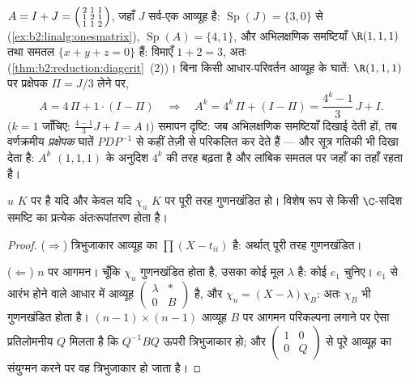 \begin{example}[विकर्णन काम पर]\label{ex:b2:reduction:diagwork}
$A = I + J = \begin{psmallmatrix}2 & 1 & 1\\ 1 & 2 & 1\\ 1 & 1 &
2\end{psmallmatrix}$, जहाँ $J$ सर्व-एक आव्यूह है:
$\operatorname{Sp}(J) = \{3, 0\}$
से (\cref{ex:b2:linalg:onesmatrix}), $\operatorname{Sp}(A) = \{4,
1\}$, और अभिलक्षणिक समष्टियाँ $\R(1,1,1)$ तथा समतल $\{x + y + z =
0\}$ हैं: विमाएँ
$1 + 2 = 3$, अतः  (\cref{thm:b2:reduction:diagcrit}~(2))। बिना किसी आधार-परिवर्तन आव्यूह के घातें:
$\R(1,1,1)$ पर प्रक्षेपक $\Pi = J/3$ लेने पर,
\[
A = 4\,\Pi + 1\cdot(I - \Pi)
\quad\Longrightarrow\quad
A^k = 4^k\,\Pi + (I - \Pi)
= \frac{4^k - 1}{3}\,J + I .
\]
($k = 1$ जाँचिए: $\frac{4-1}3 J + I = A$।) समापन दृष्टि: जब अभिलक्षणिक समष्टियाँ दिखाई देती
हों, तब वर्णक्रमीय \emph{प्रक्षेपक} घातें $PDP^{-1}$ से कहीं तेज़ी से परिकलित
कर देते हैं --- और सूत्र गतिकी भी दिखा देता है: $A^k$ $(1,1,1)$ के अनुदिश
$4^k$ की तरह बढ़ता है और लांबिक समतल पर जहाँ का तहाँ रहता है।
\end{example}

\begin{theorem}[त्रिभुजन]\label{thm:b2:reduction:trigonalization}
$u$ $K$ पर  है यदि और केवल यदि $\chi_u$ $K$ पर पूरी तरह गुणनखंडित
हो। विशेष रूप से किसी $\C$-सदिश समष्टि का प्रत्येक अंतःरूपांतरण
 होता है।
\end{theorem}

\begin{proof}
($\Rightarrow$) त्रिभुजाकार आव्यूह का  $\prod(X - t_{ii})$ है: अर्थात् पूरी तरह
गुणनखंडित।

($\Leftarrow$) $n$ पर आगमन। चूँकि $\chi_u$ गुणनखंडित होता है, उसका कोई मूल $\lambda$ है:
कोई  $e_1$ चुनिए। $e_1$ से आरंभ होने वाले आधार में आव्यूह
$\begin{pmatrix} \lambda & \ast\\ 0 &
B\end{pmatrix}$ है, और $\chi_u = (X - \lambda)\chi_B$: अतः $\chi_B$ भी गुणनखंडित होता है। $(n-1) \times
(n-1)$ आव्यूह $B$ पर आगमन
परिकल्पना लगाने पर ऐसा प्रतिलोमनीय $Q$ मिलता है कि $Q^{-1}BQ$ ऊपरी
त्रिभुजाकार हो; और $\begin{pmatrix}1 & 0\\
0 & Q\end{pmatrix}$ से पूरे आव्यूह का संयुग्मन करने पर वह
त्रिभुजाकार हो जाता है।
\end{proof}

